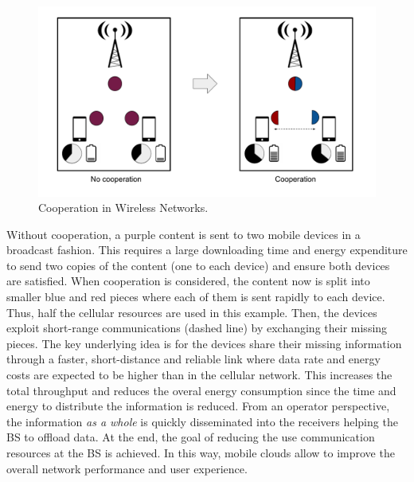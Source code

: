 \begin{figure}[ht!]
  \centering
  \includegraphics[width=\textwidth]{introduction/figures/cooperation.pdf}
  \caption{Cooperation in Wireless Networks.}
\label{fig:cooperation}
\end{figure}

Without cooperation, a purple content is sent to two mobile devices in a broadcast fashion. This requires a large downloading time and energy expenditure to send two copies of the content (one to each device) and ensure both devices are satisfied. When cooperation is considered, the content now is split into smaller blue and red pieces where each of them is sent rapidly to each device. Thus, half the cellular resources are used in this example. Then, the devices exploit short-range communications (dashed line) by exchanging their missing pieces. The key underlying idea is for the devices share their missing information through a faster, short-distance and reliable link where data rate and energy costs are expected to be higher than in the cellular network. This increases the total throughput and reduces the overal energy consumption since the time and energy to distribute the information is reduced. From an operator perspective, the information \textit{as a whole} is quickly disseminated into the receivers helping the \ac{BS} to offload data. At the end, the goal of reducing the use communication resources at the \ac{BS} is achieved. In this way, mobile clouds allow to improve the overall network performance and user experience.

